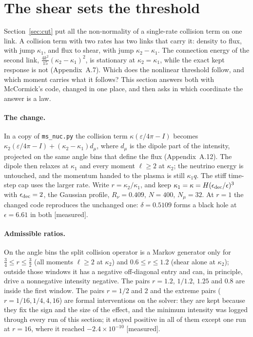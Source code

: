 \documentclass[11pt]{article}
\newcommand{\grade}[1]{\textsf{\small[#1]}}
\begin{document}
\section{The shear sets the threshold}\label{sec:link}

Section~\ref{sec:cut} put all the non-normality of a single-rate collision term on one link. A collision term with two rates has two links that carry it: density to flux, with jump $\kappa_1$, and flux to shear, with jump $\kappa_2-\kappa_1$. The connection energy of the second link, $\tfrac{4k^2}{15}(\kappa_2-\kappa_1)^2$, is stationary at $\kappa_2=\kappa_1$, while the exact kept response is not (Appendix~A.7). Which does the nonlinear threshold follow, and which moment carries what it follows? This section answers both with McCormick's code, changed in one place, and then asks in which coordinate the answer is a law.

\paragraph{The change.} In a copy of \texttt{ms\_nuc.py} the collision term $\kappa(\varepsilon/4\pi-I)$ becomes $\kappa_2(\varepsilon/4\pi-I)+(\kappa_2-\kappa_1)d_\mu$, where $d_\mu$ is the dipole part of the intensity, projected on the same angle bins that define the flux (Appendix~A.12). The dipole then relaxes at $\kappa_1$ and every moment $\ell\ge2$ at $\kappa_2$; the neutrino energy is untouched, and the momentum handed to the plasma is still $\kappa_1q$. The stiff time-step cap uses the larger rate. Write $r=\kappa_2/\kappa_1$, and keep $\kappa_1=\kappa=H(\epsilon_{\rm dec}/\epsilon)^3$ with $\epsilon_{\rm dec}=2$, the Gaussian profile, $R_\nu=0.409$, $N=400$, $N_\mu=32$. At $r=1$ the changed code reproduces the unchanged one: $\delta=0.5109$ forms a black hole at $\epsilon=6.61$ in both \grade{measured}.

\paragraph{Admissible ratios.} On the angle bins the split collision operator is a Markov generator only for $\tfrac34\le r\le\tfrac32$ (all moments $\ell\ge2$ at $\kappa_2$) and $0.6\le r\le1.2$ (shear alone at $\kappa_2$); outside those windows it has a negative off-diagonal entry and can, in principle, drive a nonnegative intensity negative. The pairs $r=1.2$, $1/1.2$, $1.25$ and $0.8$ are inside the first window. The pairs $r=1/2$ and $2$ and the extreme pairs ($r=1/16,1/4,4,16$) are formal interventions on the solver: they are kept because they fix the sign and the size of the effect, and the minimum intensity was logged through every run of this section; it stayed positive in all of them except one run at $r=16$, where it reached $-2.4\times10^{-10}$ \grade{measured}.
\end{document}
